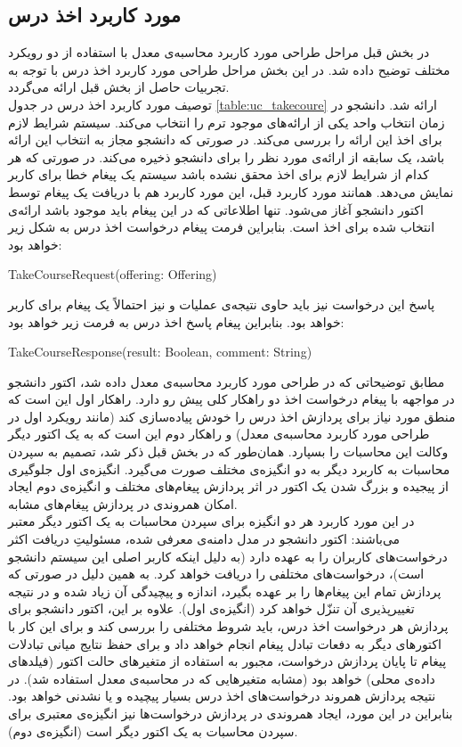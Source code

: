 \subsection{مورد کاربرد اخذ درس}
\label{subsection:take_course_uc_design}
در بخش قبل مراحل طراحی مورد کاربرد محاسبه‌ی معدل با استفاده از دو رویکرد مختلف توضیح داده شد. در این بخش مراحل طراحی مورد کاربرد اخذ درس با توجه به تجربیات حاصل از بخش قبل ارائه می‌گردد. \\
توصیف مورد کاربرد اخذ درس در جدول \ref{table:uc_takecoure} ارائه شد. دانشجو در زمان انتخاب واحد یکی از ارائه‌های موجود ترم را انتخاب می‌کند. سیستم شرایط لازم برای اخذ این ارائه را بررسی می‌کند. در صورتی که دانشجو مجاز به انتخاب این ارائه باشد، یک سابقه از ارائه‌ی مورد نظر را برای دانشجو ذخیره می‌کند. در صورتی که هر کدام از شرایط لازم برای اخذ محقق نشده باشد سیستم یک پیغام خطا برای کاربر نمایش می‌دهد.
همانند مورد کاربرد قبل،‌ این مورد کاربرد هم با دریافت یک پیغام توسط اکتور دانشجو آغاز می‌شود. تنها اطلاعاتی که در این پیغام باید موجود باشد ارائه‌ی انتخاب شده برای اخذ است. بنابراین فرمت پیغام درخواست اخذ درس به شکل زیر خواهد بود:
\begin{latin}
TakeCourseRequest(offering: Offering)
\end{latin}
پاسخ این درخواست نیز باید حاوی نتیجه‌ی عملیات و نیز احتمالاً یک پیغام برای کاربر خواهد بود. بنابراین پیغام پاسخ اخذ درس به فرمت زیر خواهد بود:
\begin{latin}
TakeCourseResponse(result: Boolean, comment: String)
\end{latin}
مطابق توضیحاتی که در طراحی مورد کاربرد محاسبه‌ی معدل داده ‌شد، اکتور دانشجو در مواجهه با پیغام درخواست اخذ دو راهکار کلی پیش رو دارد. راهکار اول این است که منطق مورد نیاز برای پردازش اخذ درس را خودش پیاده‌سازی کند (مانند رویکرد اول در طراحی مورد کاربرد محاسبه‌ی معدل) و راهکار دوم این است که به یک اکتور دیگر وکالت این محاسبات را بسپارد. همان‌طور که در بخش قبل ذکر شد،‌ تصمیم به سپردن محاسبات به کاربرد دیگر به دو انگیزه‌ی مختلف صورت می‌گیرد. انگیزه‌ی اول جلوگیری از پیجیده و بزرگ شدن یک اکتور در اثر پردازش پیغام‌های مختلف و انگیزه‌ی دوم ایجاد امکان همروندی در پردازش پیغام‌های مشابه.\\
در این مورد کاربرد هر دو انگیزه برای سپردن محاسبات به یک اکتور دیگر معتبر می‌باشند: اکتور دانشجو در مدل دامنه‌ی معرفی شده، مسئولیتِ دریافت اکثر درخواست‌های کاربران را به عهده دارد (به دلیل اینکه کاربر اصلی این سیستم دانشجو است)، درخواست‌های مختلفی را دریافت خواهد کرد. به همین دلیل در صورتی که  پردازش تمام این پیغام‌ها را بر عهده بگیرد، اندازه و پیچیدگی آن زیاد شده و در نتیجه تغییرپذیری آن تنزّل خواهد کرد (انگیزه‌ی اول). علاوه بر این، اکتور دانشجو برای پردازش هر درخواست اخذ درس، باید شروط مختلفی را بررسی کند و برای این کار با اکتورهای دیگر به دفعات تبادل پیغام انجام خواهد داد و برای حفظ نتایج میانی تبادلات پیغام تا پایان پردازش درخواست، مجبور به استفاده از متغیرهای حالت اکتور (فیلدهای داده‌ی محلی) خواهد بود (مشابه متغیرهایی که در محاسبه‌ی معدل استفاده شد). در نتیجه پردازش همروند درخواست‌های اخذ درس بسیار پیچیده و یا نشدنی خواهد بود. بنابراین در این مورد، ایجاد همروندی در پردازش درخواست‌ها نیز انگیزه‌ی معتبری برای سپردن محاسبات به یک اکتور دیگر است (انگیزه‌ی دوم). \\
